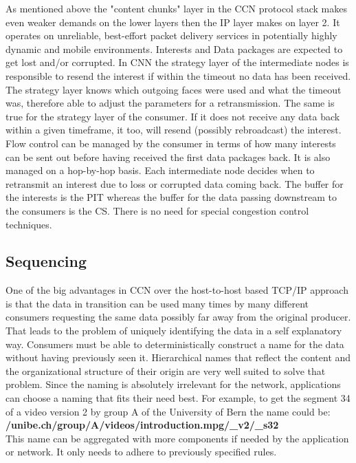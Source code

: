 As mentioned above the "content chunks" layer in the CCN protocol stack makes even weaker demands on the lower layers then the IP layer makes on layer 2. It operates on unreliable, best-effort packet delivery services in potentially highly dynamic and mobile environments. Interests and Data packages are expected to get lost and/or corrupted. In CNN the strategy layer of the intermediate nodes is responsible to resend the interest if within the timeout no data has been received. The strategy layer knows which outgoing faces were used and what the timeout was, therefore able to adjust the parameters for a retransmission. The same is true for the strategy layer of the consumer. If it does not receive any data back within a given timeframe, it too, will resend (possibly rebroadcast) the interest.
Flow control can be managed by the consumer in terms of how many interests can be sent out before having received the first data packages back. It is also managed on a hop-by-hop basis. Each intermediate node decides when to retransmit an interest due to loss or corrupted data coming back. The buffer for the interests is the PIT whereas the buffer for the data passing downstream to the consumers is the CS. There is no need for special congestion control techniques.

\subsection{Sequencing}

One of the big advantages in CCN over the host-to-host based TCP/IP approach is that the data in transition can be used many times by many different consumers requesting the same data possibly far away from the original producer. That leads to the problem of uniquely identifying the data in a self explanatory way. Consumers must be able to deterministically construct a name for the data without having previously seen it. Hierarchical names that reflect the content and the organizational structure of their origin are very well suited to solve that problem. Since the naming is absolutely irrelevant for the network, applications can choose a naming that fits their need best. For example, to get the segment 34 of a video version 2 by group A of the University of Bern the name could be: \textbf{/unibe.ch/group/A/videos/introduction.mpg/\_v2/\_s32}\\
This name can be aggregated with more components if needed by the application or network. It only needs to adhere to previously specified rules.


